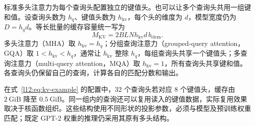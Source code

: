 标准多头注意力为每个查询头配置独立的键值头。也可以让多个查询头共用一组键和值。设查询头数为 $h_q$、键值头数为 $h_{\mathrm{kv}}$，每个头的维度为 $d$，模型宽度仍为 $D=h_qd$。等长批量的缓存容量统一写为
\begin{equation}
 M_{\mathrm{KV}}=2BLNh_{\mathrm{kv}}d\,b_{\mathrm{elem}}.
 \label{l12:eq:grouped-kv}
\end{equation}
多头注意力（MHA）取 $h_{\mathrm{kv}}=h_q$；分组查询注意力（grouped-query attention，GQA）取 $1<h_{\mathrm{kv}}<h_q$，通常让 $h_{\mathrm{kv}}$ 整除 $h_q$，每组查询头共享一个键值头；多查询注意力（multi-query attention，MQA）取 $h_{\mathrm{kv}}=1$，所有查询头共享键和值。各查询头仍保留自己的查询，计算各自的匹配分数和输出。

在式~\eqref{l12:eq:kv-example} 的配置中，$32$ 个查询头若对应 $8$ 个键值头，缓存由 $2\ \mathrm{GiB}$ 降至 $0.5\ \mathrm{GiB}$。同一组内的查询还可以复用读入的键值数据，实际复用效果取决于核函数组织。这些结构使用不同形状的投影参数，必须与模型及预训练权重匹配；既定 GPT-2 权重的推理仍采用其原有多头结构。
